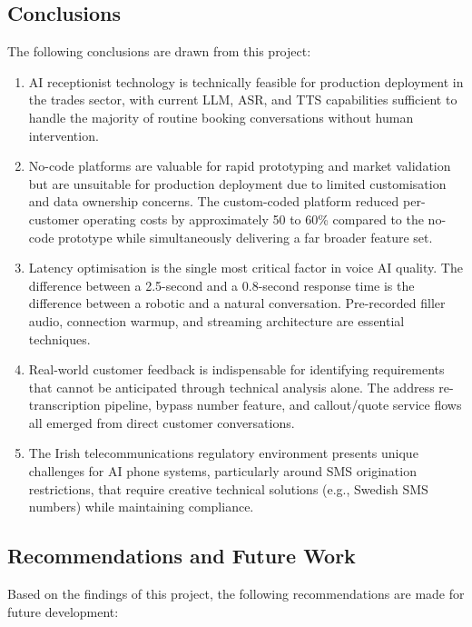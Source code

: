 \documentclass[conference]{IEEEtran}
\begin{document}
\subsection{Conclusions}

The following conclusions are drawn from this project:

\begin{enumerate}
\item AI receptionist technology is technically feasible for production deployment in the trades sector, with current LLM, ASR, and TTS capabilities sufficient to handle the majority of routine booking conversations without human intervention.
\item No-code platforms are valuable for rapid prototyping and market validation but are unsuitable for production deployment due to limited customisation and data ownership concerns. The custom-coded platform reduced per-customer operating costs by approximately 50 to 60\% compared to the no-code prototype while simultaneously delivering a far broader feature set.
\item Latency optimisation is the single most critical factor in voice AI quality. The difference between a 2.5-second and a 0.8-second response time is the difference between a robotic and a natural conversation. Pre-recorded filler audio, connection warmup, and streaming architecture are essential techniques.
\item Real-world customer feedback is indispensable for identifying requirements that cannot be anticipated through technical analysis alone. The address re-transcription pipeline, bypass number feature, and callout/quote service flows all emerged from direct customer conversations.
\item The Irish telecommunications regulatory environment presents unique challenges for AI phone systems, particularly around SMS origination restrictions, that require creative technical solutions (e.g., Swedish SMS numbers) while maintaining compliance.
\end{enumerate}


\subsection{Recommendations and Future Work}

Based on the findings of this project, the following recommendations are made for future development:
\end{document}
